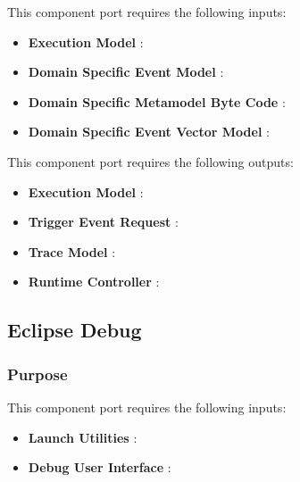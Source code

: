 \documentclass{gemoc} %
\begin{document}
This component port requires the following inputs:
\begin{itemize}
  \item \textbf{Execution Model} :
  \item \textbf{Domain Specific Event Model} :
  \item \textbf{Domain Specific Metamodel Byte Code} :
  \item \textbf{Domain Specific Event Vector Model} :
\end{itemize}

This component port requires the following outputs:
\begin{itemize}
  \item \textbf{Execution Model} :
  \item \textbf{Trigger Event Request} :
  \item \textbf{Trace Model} :
  \item \textbf{Runtime Controller} :
\end{itemize}

\subsection{Eclipse Debug}


\subsubsection{Purpose}

This component port requires the following inputs:
\begin{itemize}
  \item \textbf{Launch Utilities} :
  \item \textbf{Debug User Interface} :
\end{itemize}
\end{document}
